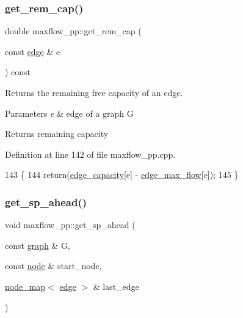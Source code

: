 \subsubsection{\texorpdfstring{get\+\_\+rem\+\_\+cap()}{get\_rem\_cap()}}
{\footnotesize\ttfamily double maxflow\+\_\+pp\+::get\+\_\+rem\+\_\+cap (\begin{DoxyParamCaption}\item[{const \mbox{\hyperlink{classedge}{edge}} \&}]{e }\end{DoxyParamCaption}) const}

Returns the remaining free capacity of an edge.


\begin{DoxyParams}{Parameters}
{\em e} & edge of a graph G \\
\hline
\end{DoxyParams}
\begin{DoxyReturn}{Returns}
remaining capacity 
\end{DoxyReturn}


Definition at line 142 of file maxflow\+\_\+pp.\+cpp.


\begin{DoxyCode}
143 \{
144     \textcolor{keywordflow}{return}(\mbox{\hyperlink{classmaxflow__pp_af3cdc4999a86322271a80b1855d58629}{edge\_capacity}}[e] - \mbox{\hyperlink{classmaxflow__pp_a25d5bb2ab6c775a634dacf408ff55a83}{edge\_max\_flow}}[e]);
145 \}
\end{DoxyCode}
\mbox{\label{classmaxflow__pp_a340e4b9909a44ed7003760017c761e3b}} 
\subsubsection{\texorpdfstring{get\+\_\+sp\+\_\+ahead()}{get\_sp\_ahead()}}
{\footnotesize\ttfamily void maxflow\+\_\+pp\+::get\+\_\+sp\+\_\+ahead (\begin{DoxyParamCaption}\item[{const \mbox{\hyperlink{classgraph}{graph}} \&}]{G,  }\item[{const \mbox{\hyperlink{classnode}{node}} \&}]{start\+\_\+node,  }\item[{\mbox{\hyperlink{classnode__map}{node\+\_\+map}}$<$ \mbox{\hyperlink{classedge}{edge}} $>$ \&}]{last\+\_\+edge }\end{DoxyParamCaption})\hspace{0.3cm}{\ttfamily [protected]}}



